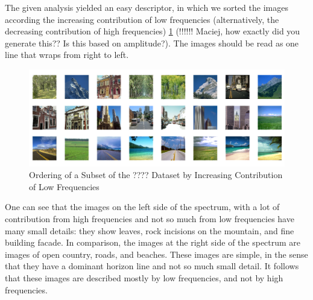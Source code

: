 \documentclass{report}
\begin{document}
The given analysis yielded an easy descriptor, in which we sorted the images according the increasing contribution of low frequencies (alternatively, the decreasing contribution of high frequencies) \ref{fig:fft_low_freq_order} (!!!!!! Maciej, how exactly did you generate this?? Is this based on amplitude?). The images should be read as one line that wraps from right to left. 
\begin{figure}[hbtp]
\centering
\includegraphics[scale=0.3]{graphics/FrequencyOrdered.png}
\caption{Ordering of a Subset of the ???? Dataset by Increasing Contribution of Low Frequencies}
\label{fig:fft_low_freq_order}
\end{figure}
One can see that the images on the left side of the spectrum, with a lot of contribution from high frequencies and not so much from low frequencies have many small details: they show leaves, rock incisions on the mountain, and fine building facade. In comparison, the images at the right side of the spectrum are images of open country, roads, and beaches. These images are simple, in the sense that they have a dominant horizon line and not so much small detail. It follows that these images are described mostly by low frequencies, and not by high frequencies.
\end{document}
